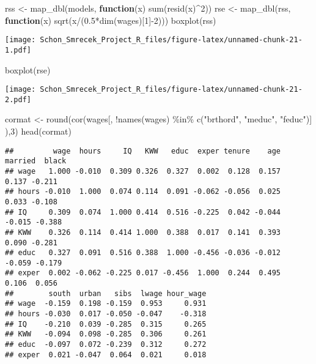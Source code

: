 \documentclass[
]{article}
\newenvironment{Shaded}{\begin{snugshade}}{\end{snugshade}}
\newcommand{\ControlFlowTok}[1]{\textcolor[rgb]{0.13,0.29,0.53}{\textbf{#1}}}
\newcommand{\DecValTok}[1]{\textcolor[rgb]{0.00,0.00,0.81}{#1}}
\newcommand{\FloatTok}[1]{\textcolor[rgb]{0.00,0.00,0.81}{#1}}
\newcommand{\FunctionTok}[1]{\textcolor[rgb]{0.00,0.00,0.00}{#1}}
\newcommand{\NormalTok}[1]{#1}
\newcommand{\OtherTok}[1]{\textcolor[rgb]{0.56,0.35,0.01}{#1}}
\newcommand{\SpecialCharTok}[1]{\textcolor[rgb]{0.00,0.00,0.00}{#1}}
\newcommand{\StringTok}[1]{\textcolor[rgb]{0.31,0.60,0.02}{#1}}
\begin{document}
\begin{Shaded}
\begin{Highlighting}[]
\NormalTok{rss }\OtherTok{\textless{}{-}} \FunctionTok{map\_dbl}\NormalTok{(models, }\ControlFlowTok{function}\NormalTok{(x) }\FunctionTok{sum}\NormalTok{(}\FunctionTok{resid}\NormalTok{(x)}\SpecialCharTok{\^{}}\DecValTok{2}\NormalTok{))}
\NormalTok{rse }\OtherTok{\textless{}{-}} \FunctionTok{map\_dbl}\NormalTok{(rss, }\ControlFlowTok{function}\NormalTok{(x) }\FunctionTok{sqrt}\NormalTok{(x}\SpecialCharTok{/}\NormalTok{(}\FloatTok{0.5}\SpecialCharTok{*}\FunctionTok{dim}\NormalTok{(wages)[}\DecValTok{1}\NormalTok{]}\SpecialCharTok{{-}}\DecValTok{2}\NormalTok{)))}
\FunctionTok{boxplot}\NormalTok{(rss)}
\end{Highlighting}
\end{Shaded}

\texttt{[image: Schon\_Smrecek\_Project\_R\_files/figure-latex/unnamed-chunk-21-1.pdf]}

\begin{Shaded}
\begin{Highlighting}[]
\FunctionTok{boxplot}\NormalTok{(rse)}
\end{Highlighting}
\end{Shaded}

\texttt{[image: Schon\_Smrecek\_Project\_R\_files/figure-latex/unnamed-chunk-21-2.pdf]}

\begin{Shaded}
\begin{Highlighting}[]
\NormalTok{cormat }\OtherTok{\textless{}{-}} \FunctionTok{round}\NormalTok{(}\FunctionTok{cor}\NormalTok{(wages[, }\SpecialCharTok{!}\FunctionTok{names}\NormalTok{(wages) }\SpecialCharTok{\%in\%} \FunctionTok{c}\NormalTok{(}\StringTok{"brthord"}\NormalTok{, }\StringTok{"meduc"}\NormalTok{,    }\StringTok{"feduc"}\NormalTok{)] ),}\DecValTok{3}\NormalTok{)}
\FunctionTok{head}\NormalTok{(cormat)}
\end{Highlighting}
\end{Shaded}

\begin{verbatim}
##         wage  hours     IQ   KWW   educ  exper tenure    age married  black
## wage   1.000 -0.010  0.309 0.326  0.327  0.002  0.128  0.157   0.137 -0.211
## hours -0.010  1.000  0.074 0.114  0.091 -0.062 -0.056  0.025   0.033 -0.108
## IQ     0.309  0.074  1.000 0.414  0.516 -0.225  0.042 -0.044  -0.015 -0.388
## KWW    0.326  0.114  0.414 1.000  0.388  0.017  0.141  0.393   0.090 -0.281
## educ   0.327  0.091  0.516 0.388  1.000 -0.456 -0.036 -0.012  -0.059 -0.179
## exper  0.002 -0.062 -0.225 0.017 -0.456  1.000  0.244  0.495   0.106  0.056
##        south  urban   sibs  lwage hour_wage
## wage  -0.159  0.198 -0.159  0.953     0.931
## hours -0.030  0.017 -0.050 -0.047    -0.318
## IQ    -0.210  0.039 -0.285  0.315     0.265
## KWW   -0.094  0.098 -0.285  0.306     0.261
## educ  -0.097  0.072 -0.239  0.312     0.272
## exper  0.021 -0.047  0.064  0.021     0.018
\end{verbatim}
\end{document}
